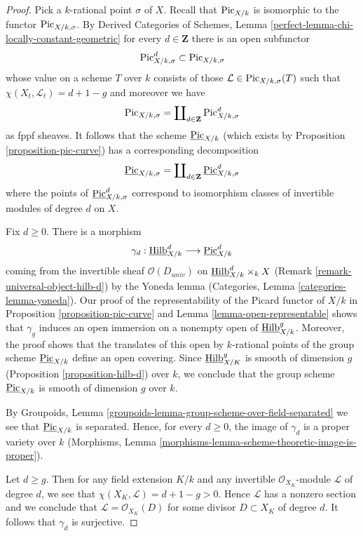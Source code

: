 \begin{proof}
Pick a $k$-rational point $\sigma$ of $X$. Recall that $\mathrm{Pic}_{X/k}$
is isomorphic to the functor $\mathrm{Pic}_{X/k, \sigma}$. By
Derived Categories of Schemes, Lemma
\ref{perfect-lemma-chi-locally-constant-geometric}
for every $d \in \mathbf{Z}$ there is an open subfunctor
$$
\mathrm{Pic}^d_{X/k, \sigma} \subset \mathrm{Pic}_{X/k, \sigma}
$$
whose value on a scheme $T$ over $k$ consists of those
$\mathcal{L} \in \mathrm{Pic}_{X/k, \sigma}(T)$ such that
$\chi(X_t, \mathcal{L}_t) = d + 1 - g$ and moreover we have
$$
\mathrm{Pic}_{X/k, \sigma} =
\coprod\nolimits_{d \in \mathbf{Z}} \mathrm{Pic}^d_{X/k, \sigma}
$$
as fppf sheaves. It follows that the scheme $\underline{\mathrm{Pic}}_{X/k}$
(which exists by Proposition \ref{proposition-pic-curve})
has a corresponding decomposition
$$
\underline{\mathrm{Pic}}_{X/k, \sigma} =
\coprod\nolimits_{d \in \mathbf{Z}} \underline{\mathrm{Pic}}^d_{X/k, \sigma}
$$
where the points of $\underline{\mathrm{Pic}}^d_{X/k, \sigma}$ correspond
to isomorphism classes of invertible modules of degree $d$ on $X$.

\medskip\noindent
Fix $d \geq 0$. There is a morphism
$$
\gamma_d :
\underline{\mathrm{Hilb}}^d_{X/k}
\longrightarrow
\underline{\mathrm{Pic}}^d_{X/k}
$$
coming from the invertible sheaf $\mathcal{O}(D_{univ})$ on
$\underline{\mathrm{Hilb}}^d_{X/k} \times_k X$
(Remark \ref{remark-universal-object-hilb-d}) by the Yoneda lemma
(Categories, Lemma \ref{categories-lemma-yoneda}).
Our proof of the representability of the Picard functor of $X/k$
in Proposition \ref{proposition-pic-curve} and
Lemma \ref{lemma-open-representable} shows that $\gamma_g$
induces an open immersion on a nonempty open of
$\underline{\mathrm{Hilb}}^g_{X/k}$. Moreover, the proof shows
that the translates of this open by $k$-rational points of
the group scheme $\underline{\mathrm{Pic}}_{X/k}$ define
an open covering. Since
$\underline{\mathrm{Hilb}}^g_{X/K}$ is smooth of dimension $g$
(Proposition \ref{proposition-hilb-d})
over $k$, we conclude that the
group scheme $\underline{\mathrm{Pic}}_{X/k}$ is smooth of dimension $g$
over $k$.

\medskip\noindent
By Groupoids, Lemma \ref{groupoids-lemma-group-scheme-over-field-separated}
we see that $\underline{\mathrm{Pic}}_{X/k}$ is separated.
Hence, for every $d \geq 0$, the image of $\gamma_d$
is a proper variety over $k$
(Morphisms, Lemma \ref{morphisms-lemma-scheme-theoretic-image-is-proper}).

\medskip\noindent
Let $d \geq g$. Then for any field extension $K/k$ and any invertible
$\mathcal{O}_{X_K}$-module $\mathcal{L}$ of degree $d$, we see that
$\chi(X_K, \mathcal{L}) = d + 1 - g > 0$. Hence $\mathcal{L}$ has a
nonzero section and we conclude that $\mathcal{L} = \mathcal{O}_{X_K}(D)$
for some divisor $D \subset X_K$ of degree $d$. It follows that
$\gamma_d$ is surjective.


\end{proof}
